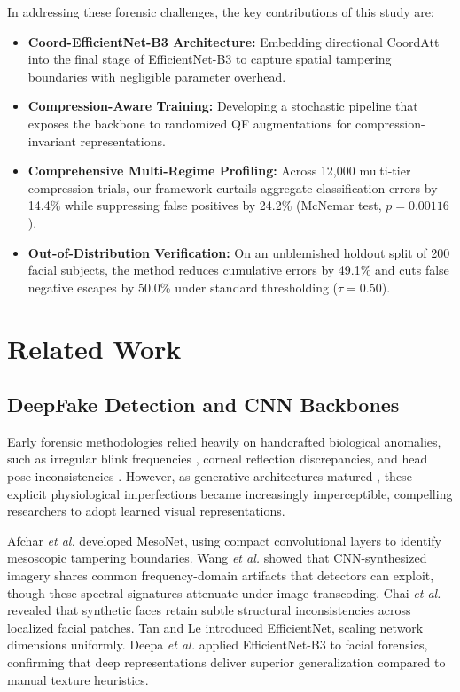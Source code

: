 \documentclass[conference]{IEEEtran}
\begin{document}
In addressing these forensic challenges, the key contributions of this study are:
\begin{itemize}
    \item \textbf{Coord-EfficientNet-B3 Architecture:} Embedding directional CoordAtt into the final stage of EfficientNet-B3 to capture spatial tampering boundaries with negligible parameter overhead.
    \item \textbf{Compression-Aware Training:} Developing a stochastic pipeline that exposes the backbone to randomized QF augmentations for compression-invariant representations.
    \item \textbf{Comprehensive Multi-Regime Profiling:} Across 12,000 multi-tier compression trials, our framework curtails aggregate classification errors by 14.4\% while suppressing false positives by 24.2\% (McNemar test, $p = 0.00116$).
    \item \textbf{Out-of-Distribution Verification:} On an unblemished holdout split of 200 facial subjects, the method reduces cumulative errors by 49.1\% and cuts false negative escapes by 50.0\% under standard thresholding ($\tau = 0.50$).
\end{itemize}

\section{Related Work}

\subsection{DeepFake Detection and CNN Backbones}
Early forensic methodologies relied heavily on handcrafted biological anomalies, such as irregular blink frequencies \cite{li2018ictu}, corneal reflection discrepancies, and head pose inconsistencies \cite{mirsky2021creation}. However, as generative architectures matured \cite{karras2019style}, these explicit physiological imperfections became increasingly imperceptible, compelling researchers to adopt learned visual representations.

Afchar \emph{et al.} \cite{afchar2018mesonet} developed MesoNet, using compact convolutional layers to identify mesoscopic tampering boundaries. Wang \emph{et al.} \cite{wang2020cnn} showed that CNN-synthesized imagery shares common frequency-domain artifacts that detectors can exploit, though these spectral signatures attenuate under image transcoding. Chai \emph{et al.} \cite{chai2020what} revealed that synthetic faces retain subtle structural inconsistencies across localized facial patches. Tan and Le \cite{tan2019efficientnet} introduced EfficientNet, scaling network dimensions uniformly. Deepa \emph{et al.} \cite{deepa2026enhanced} applied EfficientNet-B3 to facial forensics, confirming that deep representations deliver superior generalization compared to manual texture heuristics.
\end{document}
